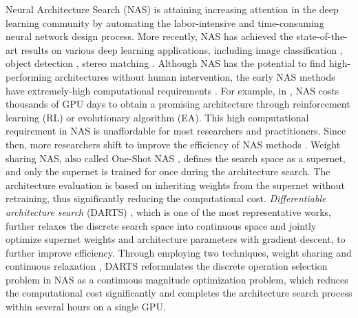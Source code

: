 \documentclass[10pt,twocolumn,letterpaper]{article}
\begin{document}
Neural Architecture Search (NAS) \cite{ren2020comprehensive,LiPYWLLC20,ChengZHDCDLG20,LiWWLLC21,LiTWPWLC21} is attaining increasing attention in the deep learning community by automating the labor-intensive and time-consuming neural network design process. More recently, NAS has achieved the state-of-the-art results on various deep learning applications, including image classification \cite{tan2019efficientnet}, object detection \cite{chen2019detnas}, stereo matching \cite{cheng2020hierarchical}. Although NAS has the potential to find high-performing architectures without human intervention, the early NAS methods have extremely-high computational requirements \cite{zoph2018learning,real2018regularized,guo2018irlas}. For example, in \cite{zoph2018learning,real2018regularized}, NAS costs thousands of GPU days to obtain a promising architecture through reinforcement
learning (RL) or evolutionary algorithm (EA). This high computational requirement in NAS is unaffordable for most researchers and practitioners. Since then, more researchers shift to improve the efficiency of NAS methods \cite{li2019random,guo2019single,pham2018efficient}. Weight sharing NAS, also called One-Shot NAS \cite{bender2018understanding,pham2018efficient}, defines the search space as a supernet, and only the supernet is trained for once during the architecture search. The architecture evaluation is based on inheriting weights from the supernet without retraining, thus significantly reducing the computational cost. \textit{Differentiable architecture search} (DARTS)  \cite{liu2018darts}, which is one of the most representative works, further relaxes the discrete search space into continuous space and jointly optimize supernet weights and architecture parameters with gradient descent, to further improve efficiency. Through employing two techniques, weight sharing \cite{bender2018understanding,pham2018efficient} and continuous relaxation \cite{liu2018darts,xie2018snas,GDAS,cai2018proxylessnas}, DARTS reformulates the discrete operation selection problem in NAS as a continuous magnitude optimization problem, which reduces the computational cost significantly and completes the architecture search process within several hours on a single GPU. 
\end{document}
